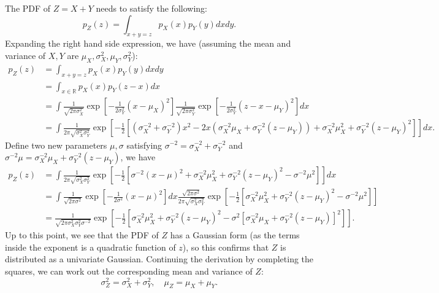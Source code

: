 The PDF of $Z = X + Y$ needs to satisfy the following:
$$p_Z(z) = \int_{x+y = z} p_X(x)p_Y(y) dx dy.$$
Expanding the right hand side expression, we have (assuming the mean and variance of $X, Y$ are $\mu_X, \sigma^2_X, \mu_Y, \sigma^2_Y$):
\begin{equation*}
\begin{aligned}
p_Z(z) &= \int_{x+y = z} p_X(x)p_Y(y) dx dy \\
&= \int_{x \in \mathbb{R}} p_X(x)p_Y(z - x) dx \\
&= \int \frac{1}{\sqrt{2\pi \sigma^2_X}} \exp[-\frac{1}{2\sigma^2_Y}(x - \mu_X)^2]  \frac{1}{\sqrt{2\pi \sigma^2_Y}} \exp[-\frac{1}{2\sigma^2_Y}(z - x - \mu_Y)^2] dx \\
&= \int \frac{1}{2 \pi \sqrt{\sigma^2_X \sigma^2_Y}} \exp[-\frac{1}{2}[ (\sigma_X^{-2} + \sigma_Y^{-2}) x^2 - 2 x (\sigma_X^{-2} \mu_X + \sigma_Y^{-2}(z - \mu_Y)) + \sigma_X^{-2} \mu_X^2 + \sigma_Y^{-2} (z - \mu_Y)^2 ]] dx.
\end{aligned}
\end{equation*}
Define two new parameters $\mu, \sigma$ satisfying $\sigma^{-2} = \sigma_X^{-2} + \sigma_Y^{-2}$ and $\sigma^{-2} \mu = \sigma_X^{-2} \mu_X + \sigma_Y^{-2}(z - \mu_Y)$, we have
\begin{equation*}
\begin{aligned}
p_Z(z) &= \int \frac{1}{2 \pi \sqrt{\sigma^2_X \sigma^2_Y}} \exp[-\frac{1}{2}[ \sigma^{-2} (x - \mu)^2 + \sigma_X^{-2} \mu_X^2 + \sigma_Y^{-2} (z - \mu_Y)^2 - \sigma^{-2} \mu^2 ]] dx \\
&= \int \frac{1}{\sqrt{2 \pi \sigma^2}} \exp[-\frac{1}{2 \sigma^2} (x - \mu)^2] dx \frac{\sqrt{2 \pi \sigma^2}}{2 \pi \sqrt{\sigma^2_X \sigma^2_Y}} \exp[-\frac{1}{2}[ \sigma_X^{-2} \mu_X^2 + \sigma_Y^{-2} (z - \mu_Y)^2 - \sigma^{-2} \mu^2 ]] \\
&= \frac{1}{\sqrt{2 \pi \sigma^2_X \sigma^2_Y \sigma^{-2}}} \exp[-\frac{1}{2}[ \sigma_X^{-2} \mu_X^2 + \sigma_Y^{-2} (z - \mu_Y)^2 - \sigma^2 [\sigma_X^{-2} \mu_X + \sigma_Y^{-2}(z - \mu_Y)]^2 ]]. 
\end{aligned}
\end{equation*}
Up to this point, we see that the PDF of $Z$ has a Gaussian form (as the terms inside the exponent is a quadratic function of $z$), so this confirms that $Z$ is distributed as a univariate Gaussian. Continuing the derivation by completing the squares, we can work out the corresponding mean and variance of $Z$:
$$\sigma_Z^2 = \sigma_X^2 + \sigma_Y^2, \quad \mu_Z = \mu_X + \mu_Y.$$


